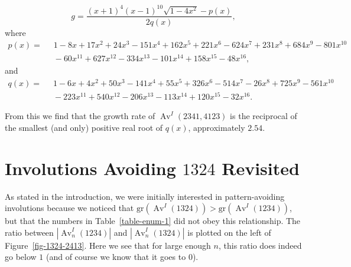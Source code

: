 \documentclass[10pt]{article}
\theoremstyle{plain}
\newcommand{\Av}{\operatorname{Av}}
\newcommand{\gr}{\mathrm{gr}}
\begin{document}
\[g = \frac{(x+1)^4(x-1)^{10}\sqrt{1-4x^2} - p(x)}{2q(x)},\]
where
\begin{align*}
	p(x) =& \;\;1 - 8x + 17x^2 + 24x^3 - 151x^4 + 162x^5 + 221x^6 - 624x^7 + 231x^8 + 684x^9 - 801x^{10}\\
			&\;\;- 60x^{11} + 627x^{12} - 334x^{13} - 101x^{14} + 158x^{15} - 48x^{16},
\end{align*}
and
\begin{align*}
	q(x) =& \;\;1 - 6x + 4x^2 + 50x^3 - 141x^4 + 55x^5 + 326x^6 - 514x^7 - 26x^8 + 725x^9 - 561x^{10}\\
			&\;\; - 223x^{11} + 540x^{12} - 206x^{13} - 113x^{14} + 120x^{15} - 32x^{16}.
\end{align*}
	
From this we find that the growth rate of $\Av^I(2341,4123)$ is the reciprocal of the smallest (and only) positive real root of $q(x)$, approximately $2.54$.


\section{Involutions Avoiding $1324$ Revisited}\label{section:1324-revisited}

As stated in the introduction, we were initially interested in pattern-avoiding involutions because we noticed that $\gr(\Av^I(1324))>\gr(\Av^I(1234))$, but that the numbers in Table~\ref{table-enum-1} did not obey this relationship. The ratio between $|\Av^I_n(1234)|$ and $|\Av^I_n(1324)|$ is plotted on the left of Figure~\ref{fig-1324-2413}. Here we see that for large enough $n$, this ratio does indeed go below $1$ (and of course we know that it goes to $0$).
\end{document}
